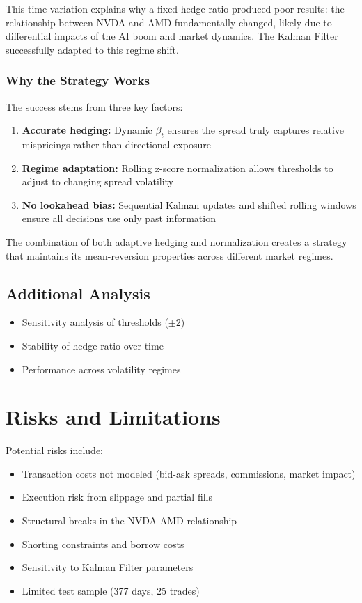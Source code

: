 \documentclass[11pt]{article}
\begin{document}
This time-variation explains why a fixed hedge ratio produced poor results: the relationship between NVDA and AMD fundamentally changed, likely due to differential impacts of the AI boom and market dynamics. The Kalman Filter successfully adapted to this regime shift.

\subsubsection{Why the Strategy Works}

The success stems from three key factors:

\begin{enumerate}
\item \textbf{Accurate hedging:} Dynamic $\beta_t$ ensures the spread truly captures relative mispricings rather than directional exposure
\item \textbf{Regime adaptation:} Rolling z-score normalization allows thresholds to adjust to changing spread volatility
\item \textbf{No lookahead bias:} Sequential Kalman updates and shifted rolling windows ensure all decisions use only past information
\end{enumerate}

The combination of both adaptive hedging and normalization creates a strategy that maintains its mean-reversion properties across different market regimes.

\subsection{Additional Analysis}

\begin{itemize}
\item Sensitivity analysis of thresholds ($\pm 2$)
\item Stability of hedge ratio over time
\item Performance across volatility regimes
\end{itemize}

\section{Risks and Limitations}

Potential risks include:

\begin{itemize}
\item Transaction costs not modeled (bid-ask spreads, commissions, market impact)
\item Execution risk from slippage and partial fills
\item Structural breaks in the NVDA-AMD relationship
\item Shorting constraints and borrow costs
\item Sensitivity to Kalman Filter parameters
\item Limited test sample (377 days, 25 trades)
\end{itemize}
\end{document}
